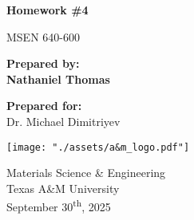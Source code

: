 \thispagestyle{empty}

\begin{titlepage}
  \begin{center}
    \vspace*{2cm}

    \Huge
    \textbf{Homework \#4}

    \vspace{0.8cm}

    \LARGE
    MSEN 640-600

    \vspace{2cm}

    \Large
    \textbf{Prepared by:}\\[0.5cm]
    \huge
    \textbf{Nathaniel Thomas}

    \vspace{1cm}

    \Large
    \textbf{Prepared for:}\\[0.5cm]
    \large
    Dr. Michael Dimitriyev

    \vfill

    \texttt{[image: "./assets/a\&m\_logo.pdf"]}

    \vspace{1cm}

    \Large
    Materials Science \& Engineering\\
    Texas A\&M University\\
    \vspace{0.5cm}
    \large
    September 30\textsuperscript{th}, 2025

  \end{center}
\end{titlepage}

\lfoot{}
\cfoot{\thepage}
\rfoot{}

\headrule

